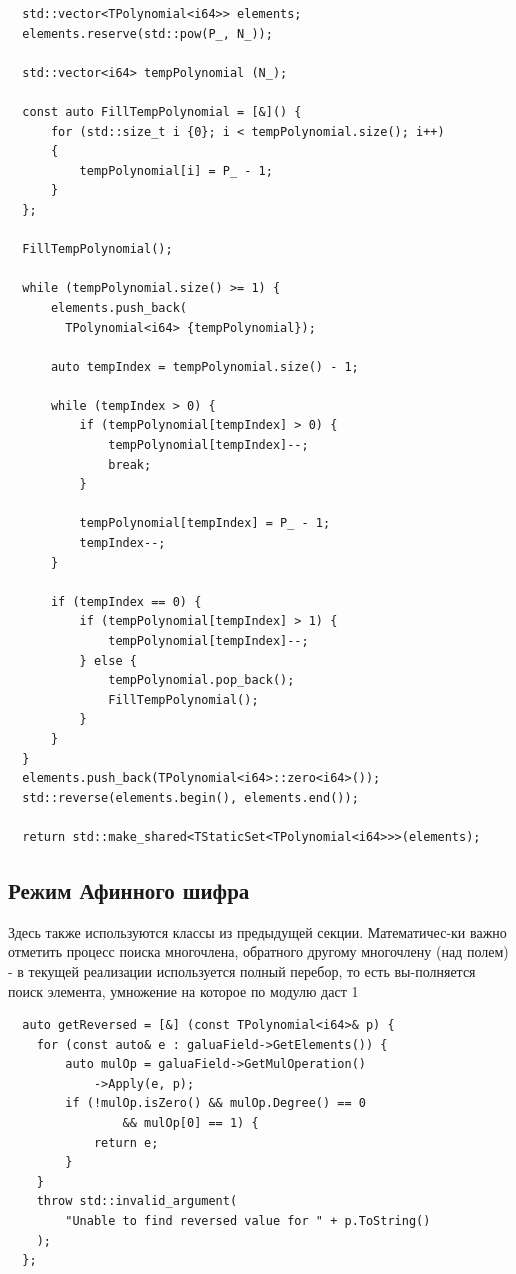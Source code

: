 \documentclass[a4paper]{article}
\newenvironment{code}{\captionsetup{type=listing}}{}
\begin{document}
\begin{code}
\begin{verbatim}
  std::vector<TPolynomial<i64>> elements;
  elements.reserve(std::pow(P_, N_));

  std::vector<i64> tempPolynomial (N_);

  const auto FillTempPolynomial = [&]() {
      for (std::size_t i {0}; i < tempPolynomial.size(); i++)
      {
          tempPolynomial[i] = P_ - 1;
      }
  };

  FillTempPolynomial();

  while (tempPolynomial.size() >= 1) {
      elements.push_back(
        TPolynomial<i64> {tempPolynomial});

      auto tempIndex = tempPolynomial.size() - 1;

      while (tempIndex > 0) {
          if (tempPolynomial[tempIndex] > 0) {
              tempPolynomial[tempIndex]--;
              break;
          }

          tempPolynomial[tempIndex] = P_ - 1;
          tempIndex--;
      }

      if (tempIndex == 0) {
          if (tempPolynomial[tempIndex] > 1) {
              tempPolynomial[tempIndex]--;
          } else {
              tempPolynomial.pop_back();
              FillTempPolynomial();
          }
      }
  }
  elements.push_back(TPolynomial<i64>::zero<i64>());
  std::reverse(elements.begin(), elements.end());
  
  return std::make_shared<TStaticSet<TPolynomial<i64>>>(elements);
\end{verbatim}
\end{code}

\subsection{Режим Афинного шифра}

Здесь также используются классы из предыдущей секции. Математичес-ки важно
отметить процесс поиска многочлена, обратного другому многочлену (над полем) -
в текущей реализации используется полный перебор, то есть вы-полняется поиск элемента,
умножение на которое по модулю даст 1

\begin{code}
\begin{verbatim}
  auto getReversed = [&] (const TPolynomial<i64>& p) {
    for (const auto& e : galuaField->GetElements()) {
        auto mulOp = galuaField->GetMulOperation()
            ->Apply(e, p);
        if (!mulOp.isZero() && mulOp.Degree() == 0 
                && mulOp[0] == 1) {
            return e;
        }
    }
    throw std::invalid_argument(
        "Unable to find reversed value for " + p.ToString()
    );
  };
\end{verbatim}
\end{code}
\end{document}

